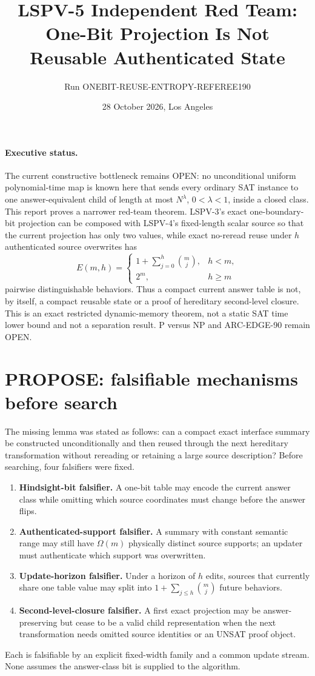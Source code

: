 \documentclass[11pt]{article}
\title{LSPV-5 Independent Red Team:\\One-Bit Projection Is Not Reusable Authenticated State}
\author{Run ONEBIT-REUSE-ENTROPY-REFEREE190}
\date{28 October 2026, Los Angeles}
\begin{document}
\maketitle

\paragraph{Executive status.}
The current constructive bottleneck remains OPEN: no unconditional uniform polynomial-time map is known here that sends every ordinary SAT instance to one answer-equivalent child of length at most $N^\lambda$, $0<\lambda<1$, inside a closed class.  This report proves a narrower red-team theorem.  LSPV-3's exact one-boundary-bit projection can be composed with LSPV-4's fixed-length scalar source so that the current projection has only two values, while exact no-reread reuse under $h$ authenticated source overwrites has
\[
 E(m,h)=
 \begin{cases}
 1+\sum_{j=0}^h {m\choose j},&h<m,\\
 2^m,&h\ge m
 \end{cases}
\]
pairwise distinguishable behaviors.  Thus a compact current answer table is not, by itself, a compact reusable state or a proof of hereditary second-level closure.  This is an exact restricted dynamic-memory theorem, not a static SAT time lower bound and not a separation result.  P versus NP and ARC-EDGE-90 remain OPEN.

\section{PROPOSE: falsifiable mechanisms before search}
The missing lemma was stated as follows: can a compact exact interface summary be constructed unconditionally and then reused through the next hereditary transformation without rereading or retaining a large source description?  Before searching, four falsifiers were fixed.
\begin{enumerate}[leftmargin=*]
\item \textbf{Hindsight-bit falsifier.} A one-bit table may encode the current answer class while omitting which source coordinates must change before the answer flips.
\item \textbf{Authenticated-support falsifier.} A summary with constant semantic range may still have $\Omega(m)$ physically distinct source supports; an updater must authenticate which support was overwritten.
\item \textbf{Update-horizon falsifier.} Under a horizon of $h$ edits, sources that currently share one table value may split into $1+\sum_{j\le h}\binom mj$ future behaviors.
\item \textbf{Second-level-closure falsifier.} A first exact projection may be answer-preserving but cease to be a valid child representation when the next transformation needs omitted source identities or an UNSAT proof object.
\end{enumerate}
Each is falsifiable by an explicit fixed-width family and a common update stream.  None assumes the answer-class bit is supplied to the algorithm.
\end{document}
